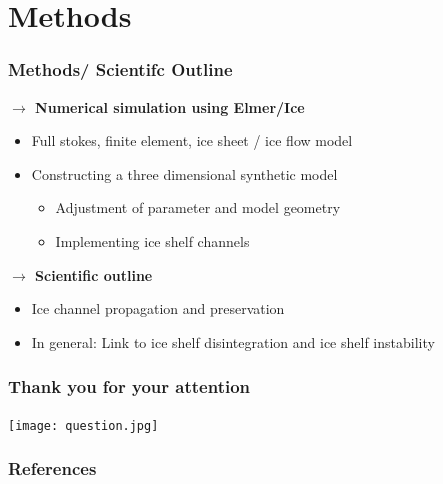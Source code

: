 \documentclass[t, pdftex]{beamer}
\begin{document}
\section{Methods}
\begin{frame}
	\frametitle{Methods/ Scientifc Outline}
	\vspace{0,4cm}
    \textcolor{utorange}{\textbf{$\rightarrow$ Numerical simulation using Elmer/Ice}} \\
\vspace{0,2cm}   
 \begin{itemize}
 \setlength\itemsep{1em}
 \item Full stokes, finite element, ice sheet / ice flow model 
 \item Constructing a three dimensional synthetic model
 			\begin{itemize}
 			\item Adjustment of parameter and model geometry
 			\item Implementing ice shelf channels
 			\end{itemize}
 			 \end{itemize}
		 
\textcolor{utorange}{\textbf{$\rightarrow$ Scientific outline}} 
\vspace{0,2cm}  
\begin{itemize} 				
 \item Ice channel propagation and preservation 
 \item In general: Link to ice shelf disintegration and ice shelf instability
\end{itemize}
\end{frame}


\begin{frame}
	\frametitle{Thank you for your attention}
    \vfill
    \centerline{\texttt{[image: question.jpg]}} 
    \vfill
\end{frame}

\begin{frame}
	\frametitle{References}
	\vspace{0,4cm}
	\item \cite{weertman1974}
	\item \cite{drews2015}
	\item \cite{hannah}
\end{frame}
\end{document}
